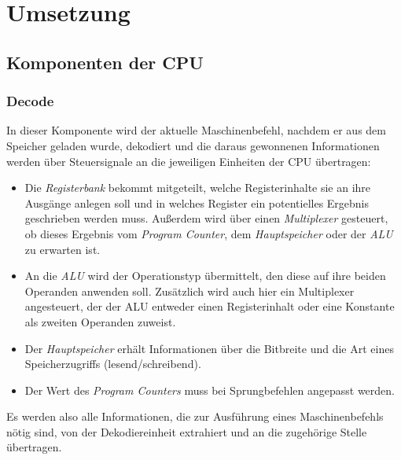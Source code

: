 \iffalse
\TODO: mem out of bound bei RAM
\TODO: Block RAM im code umbenennen
\TDOD: Probleme: RAM
\TODO: Komponente Main
\TODO: Probleme: ALU und Decode erst clk-sensitiv implementiert
\TODO: maschinenbefehle durchgehen: wurde etwas besonders implementiert?
\TODO: warum zwei Takte? => Schreibzugriff RAM, Register...?
\TODO: latches
\TODO: synchrones design
\TODO: Register erklären?
\TODO: ALU zero-flag-next entfernen
\TODO: ELF, 
\fi

\chapter{Umsetzung} %
\label{Umsetzung} %

\section{Komponenten der CPU}

%


\iffalse
- Diagramm 
- sukzessive Entwicklung, per Maschinenbefehl
\fi
\subsection{Decode}



In dieser Komponente wird der aktuelle Maschinenbefehl, nachdem er aus dem Speicher geladen wurde, dekodiert und die daraus gewonnenen Informationen werden über Steuersignale an die jeweiligen Einheiten der CPU übertragen:
\begin{itemize}
    \item Die \textit{Registerbank} bekommt mitgeteilt, welche Registerinhalte sie an ihre Ausgänge anlegen soll und in welches Register ein potentielles Ergebnis geschrieben werden muss.
        Außerdem wird über einen \textit{Multiplexer} gesteuert, ob dieses Ergebnis vom \textit{Program Counter}, dem \textit{Hauptspeicher} oder der \textit{ALU} zu erwarten ist.
    \item An die \textit{ALU} wird der Operationstyp übermittelt, den diese auf ihre beiden Operanden anwenden soll.
        Zusätzlich wird auch hier ein Multiplexer angesteuert, der der ALU entweder einen Registerinhalt oder eine Konstante als zweiten Operanden zuweist.
    \item Der \textit{Hauptspeicher} erhält Informationen über die Bitbreite und die Art eines Speicherzugriffs (lesend/schreibend).
    \item Der Wert des \textit{Program Counters} muss bei Sprungbefehlen angepasst werden.
\end{itemize}
Es werden also alle Informationen, die zur Ausführung eines Maschinenbefehls nötig sind, von der Dekodiereinheit extrahiert und an die zugehörige Stelle übertragen. 

